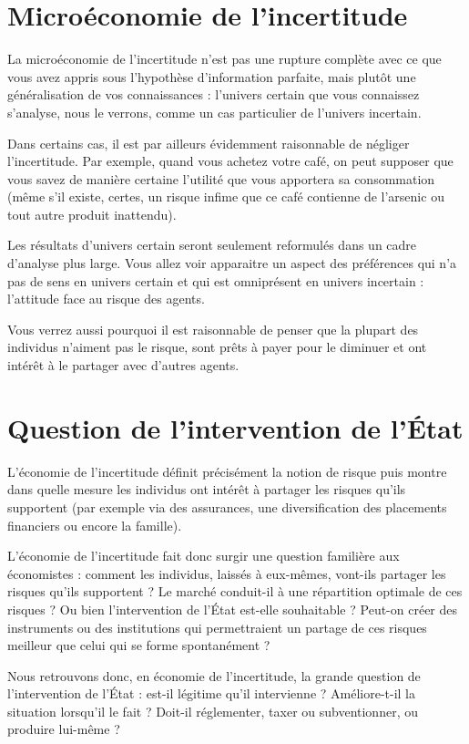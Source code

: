 \documentclass[a4paper, 12pt]{report}
\begin{document}
\section{Microéconomie de l'incertitude}

La microéconomie de l'incertitude n'est pas une rupture complète avec ce que vous avez appris sous l'hypothèse d'information parfaite, mais plutôt une généralisation de vos connaissances : l'univers certain que vous connaissez s'analyse, nous le verrons, comme un cas particulier de l'univers incertain. 

Dans certains cas, il est par ailleurs évidemment raisonnable de négliger l'incertitude. Par exemple, quand vous achetez votre café, on peut supposer que vous savez de manière certaine l'utilité que vous apportera sa consommation (même s'il existe, certes, un risque infime que ce café contienne de l'arsenic ou tout autre produit inattendu).

Les résultats d'univers certain seront seulement reformulés dans un cadre d’analyse plus large. Vous allez voir apparaitre un aspect des préférences qui n'a pas de sens en univers certain et qui est omniprésent en univers incertain : l'attitude face au risque des agents.

Vous verrez aussi pourquoi il est raisonnable de penser que la plupart des individus n'aiment pas le risque, sont prêts à payer pour le diminuer et ont intérêt à le partager avec d'autres agents. 

\section{Question de l’intervention de l'État}

L'économie de l'incertitude définit précisément la notion de risque puis montre dans quelle mesure les individus ont intérêt à partager les risques qu'ils supportent (par exemple via des assurances, une diversification des placements financiers ou encore la famille).

L'économie de l'incertitude fait donc surgir une question familière aux économistes : comment les individus, laissés à eux-mêmes, vont-ils partager les risques qu'ils supportent ? Le marché conduit-il à une répartition optimale de ces risques ? Ou bien l'intervention de l'État est-elle souhaitable ? Peut-on créer des instruments ou des institutions qui permettraient un partage de ces risques meilleur que celui qui se forme spontanément ?

Nous retrouvons donc, en économie de l'incertitude, la grande question de l'intervention de l'État : est-il légitime qu'il intervienne ? Améliore-t-il la situation lorsqu'il le fait ? Doit-il réglementer, taxer ou subventionner, ou produire lui-même ?
\end{document}
